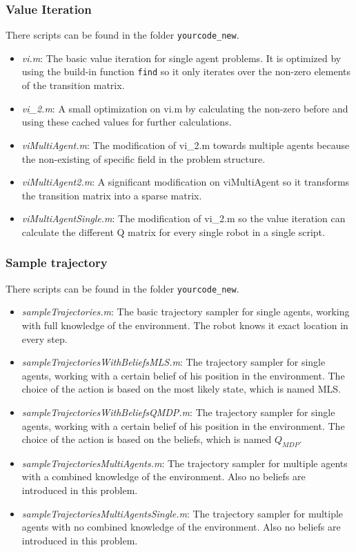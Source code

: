 \documentclass[10pt,a4paper]{article}
\begin{document}
\subsubsection*{Value Iteration}
There scripts can be found in the folder \texttt{yourcode\_new}.
\begin{itemize}
	\item \emph{vi.m}: The basic value iteration for single agent problems. It is optimized by using the build-in function \texttt{find} so it only iterates over the non-zero elements of the transition matrix.
	\item \emph{vi\_2.m}: A small optimization on vi.m by calculating the non-zero before and using these cached values for further calculations. 
	\item \emph{viMultiAgent.m}: The modification of vi\_2.m towards multiple agents because the non-existing of specific field in the problem structure.
	\item \emph{viMultiAgent2.m}: A significant modification on viMultiAgent so it transforms the transition matrix into a sparse matrix.
	\item \emph{viMultiAgentSingle.m}: The modification of vi\_2.m so the value iteration can calculate the different Q matrix for every single robot in a single script. 
	
\end{itemize}

\subsubsection*{Sample trajectory}
There scripts can be found in the folder \texttt{yourcode\_new}.
\begin{itemize}
	\item \emph{sampleTrajectories.m}: The basic trajectory sampler for single agents, working with full knowledge of the environment. The robot knows it exact location in every step.
	\item \emph{sampleTrajectoriesWithBeliefsMLS.m}: The trajectory sampler for single agents, working with a certain belief of his position in the environment. The choice of the action is based on the most likely state, which is named MLS.
	\item \emph{sampleTrajectoriesWithBeliefsQMDP.m}: The trajectory sampler for single agents, working with a certain belief of his position in the environment. The choice of the action is based on the beliefs, which is named $Q_{MDP}$.
	\item \emph{sampleTrajectoriesMultiAgents.m}: The trajectory sampler for multiple agents with a combined knowledge of the environment. Also no beliefs are introduced in this problem.
	\item \emph{sampleTrajectoriesMultiAgentsSingle.m}: The trajectory sampler for multiple agents with no combined knowledge of the environment. Also no beliefs are introduced in this problem.
\end{itemize}
\end{document}
